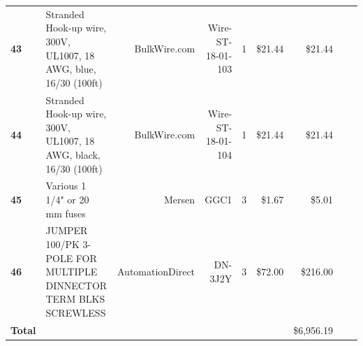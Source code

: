 \begin{table}[!htp]
{\begin{tabular}{llrrrrrrr}
			\textbf{43}    & Stranded Hook-up wire, 300V, UL1007, 18 AWG, blue, 16/30 (100ft)                 & BulkWire.com      & Wire-ST-18-01-103 & 1        & \$21.44  & \$21.44        \\
			\textbf{44}    & Stranded Hook-up wire, 300V, UL1007, 18 AWG, black, 16/30 (100ft)                & BulkWire.com      & Wire-ST-18-01-104 & 1        & \$21.44  & \$21.44        \\
			\textbf{45}    & Various 1 1/4" or 20 mm fuses                                                    & Mersen            & GGC1              & 3        & \$1.67   & \$5.01         \\
			\textbf{46}    & JUMPER 100/PK 3-POLE FOR MULTIPLE DINNECTOR TERM BLKS SCREWLESS                  & AutomationDirect  & DN-3J2Y           & 3        & \$72.00  & \$216.00       \\
			\textbf{Total} &                                                                                  &                   &                   &          &          & \$6,956.19     \\
			\bottomrule
		\end{tabular}
	}
\end{table}
